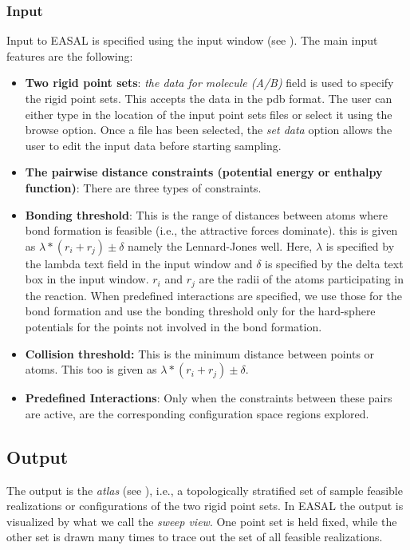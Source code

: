 \documentclass[10pt]{article}
\begin{document}
\subsubsection{Input}
Input to EASAL is specified using the input window (see ).
The main input features are the following:
\begin{itemize}
		\item \textbf{Two rigid point sets}: \emph{the data for molecule
		(A/B)} field is used to specify the rigid point sets. This accepts the
		data in the pdb format.  The user can either type in the location of
		the input point sets files or select it using the browse option. Once a
		file has been selected, the \emph{set data} option allows the user to edit
		the input data before starting sampling.
\item \textbf{The pairwise distance constraints (potential energy or enthalpy
		function)}: There are three types of constraints.

\item \textbf{Bonding threshold}: This is the range of distances between atoms
		where bond formation is feasible (i.e., the attractive forces dominate). 
		this is given as $\lambda*(r_i+r_j) 
		\pm \delta$ namely the Lennard-Jones well. 
		Here, $\lambda$ is specified by the lambda text field in
		the input window and $\delta$ is specified by the delta text box in the
		input window. $r_i$ and $r_j$ are the radii of the atoms participating
		in the reaction. When predefined interactions are specified, we use those
		for the bond formation and use the bonding threshold only for the hard-sphere
		potentials for the points not involved in the bond formation.

\item \textbf{Collision threshold:} This is the minimum distance between points or atoms. This too is given as $\lambda*(r_i+r_j)
		\pm \delta$.
		
\item \textbf{Predefined Interactions}: Only when the constraints between these pairs are active, are the corresponding configuration space regions explored. 
\end{itemize}

\subsection{Output}
The output is the \emph{atlas} (see ), i.e., a topologically stratified
set of sample feasible realizations or configurations of the two rigid point
sets. In EASAL the output is visualized by what we call the \emph{sweep view}. One
point set is  held fixed, while the other set is drawn many times to trace out
the set of all feasible realizations.
\end{document}
